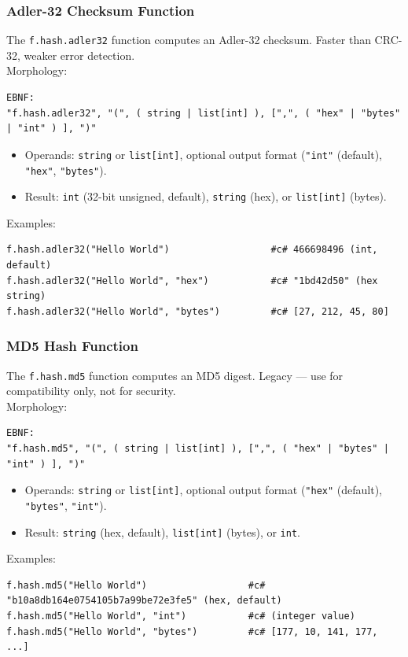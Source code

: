 \subsubsection{Adler-32 Checksum Function}
The \texttt{f.hash.adler32} function computes an Adler-32 checksum. Faster than CRC-32, weaker error detection. \\
Morphology:
\begin{verbatim}
EBNF:
"f.hash.adler32", "(", ( string | list[int] ), [",", ( "hex" | "bytes" | "int" ) ], ")"
\end{verbatim}
\begin{itemize}
\item Operands: \texttt{string} or \texttt{list[int]}, optional output format (\texttt{"int"} (default), \texttt{"hex"}, \texttt{"bytes"}).
\item Result: \texttt{int} (32-bit unsigned, default), \texttt{string} (hex), or \texttt{list[int]} (bytes).
\end{itemize}
Examples:
\begin{verbatim}
f.hash.adler32("Hello World")                  #c# 466698496 (int, default)
f.hash.adler32("Hello World", "hex")           #c# "1bd42d50" (hex string)
f.hash.adler32("Hello World", "bytes")         #c# [27, 212, 45, 80]
\end{verbatim}

\subsubsection{MD5 Hash Function}
The \texttt{f.hash.md5} function computes an MD5 digest. Legacy --- use for compatibility only, not for security. \\
Morphology:
\begin{verbatim}
EBNF:
"f.hash.md5", "(", ( string | list[int] ), [",", ( "hex" | "bytes" | "int" ) ], ")"
\end{verbatim}
\begin{itemize}
\item Operands: \texttt{string} or \texttt{list[int]}, optional output format (\texttt{"hex"} (default), \texttt{"bytes"}, \texttt{"int"}).
\item Result: \texttt{string} (hex, default), \texttt{list[int]} (bytes), or \texttt{int}.
\end{itemize}
Examples:
\begin{verbatim}
f.hash.md5("Hello World")                  #c# "b10a8db164e0754105b7a99be72e3fe5" (hex, default)
f.hash.md5("Hello World", "int")           #c# (integer value)
f.hash.md5("Hello World", "bytes")         #c# [177, 10, 141, 177, ...]
\end{verbatim}

